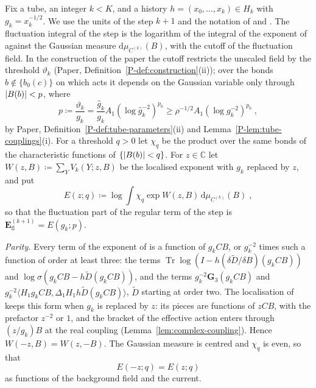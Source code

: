 \documentclass[11pt]{preprint}
\newcommand{\dd}{\mathrm{d}}
\DeclarePairedDelimiter{\abs}{\lvert}{\rvert}
\numberwithin{equation}{section}
\theoremstyle{definition}
\theoremstyle{remark}
\theoremstyle{plain}
\begin{document}
Fix a tube, an integer $k < K$, and a history $h = (x_0, \dots, x_k) \in H_k$ with $g_k = x_k^{-1/2}$. We use the units of the step $k + 1$ and the notation of \cite[Sect.~2]{BalabanRG1} and \cite{BalabanRG2}. The fluctuation integral of the step is the logarithm of the integral \cite[(2.12), (2.13), p.~268]{BalabanRG1} of the exponent of \cite[(2.12)]{BalabanRG1} against the Gaussian measure $\dd\mu_{C^{(k)}}(B)$, with the cutoff of the fluctuation field. In the construction of the paper the cutoff restricts the unscaled field by the threshold $\vartheta_k$ (Paper, Definition~\ref{P-def:construction}(ii)); over the bonds $b \notin \{ b_0(c) \}$ on which \cite[(2.9), p.~266]{BalabanRG1} acts it depends on the Gaussian variable only through $\abs{B(b)} < p$, where
\begin{equation}\label{eq:scaled-threshold}
    p \coloneqq \frac{\vartheta_k}{g_k} = \frac{\hat g_k}{g_k}A_1(\log\hat g_k^{-2})^{p_0} \geq \rho^{-1/2}A_1(\log g_k^{-2})^{p_0}\;,
\end{equation}
by Paper, Definition~\ref{P-def:tube-parameters}(ii) and Lemma~\ref{P-lem:tube-couplings}(i). For a threshold $q > 0$ let $\chi_q$ be the product over the same bonds of the characteristic functions of $\{ \abs{B(b)} < q \}$. For $z \in \mathbb C$ let $W(z, B) \coloneqq \sum_YV_k(Y; z, B)$ be the localised exponent \cite[(1.41), p.~11]{BalabanRG2} with $g_k$ replaced by $z$, and put
\begin{equation}\label{eq:complex-fluctuation-integral}
    E(z; q) \coloneqq \log\int\chi_q\exp W(z, B)\,\dd\mu_{C^{(k)}}(B)\;,
\end{equation}
so that the fluctuation part of the regular term of the step is $\mathbf E^{(k+1)}_{\mathrm{fl}} = E(g_k; p)$.

\emph{Parity.} Every term of the exponent of \cite[(2.12), p.~268]{BalabanRG1} is a function of $g_kCB$, or $g_k^{-2}$ times such a function of order at least three: the terms $\operatorname{Tr}\log(I - h(\delta\tilde D/\delta B)(g_kCB))$ and $\log\sigma(g_kCB - h\tilde D(g_kCB))$, and the terms $g_k^{-2}\mathbf G_3(g_kCB)$ and $g_k^{-2}\langle H_1g_kCB, \Delta_1H_1h\tilde D(g_kCB)\rangle$, $\tilde D$ starting at order two. The localisation of \cite[(1.33)--(1.41), pp.~9--11]{BalabanRG2} keeps this form when $g_k$ is replaced by $z$: its pieces are functions of $zCB$, with the prefactor $z^{-2}$ or $1$, and the bracket of the effective action enters through $(z/g_k)B$ at the real coupling (Lemma~\ref{lem:complex-coupling}). Hence $W(-z, B) = W(z, -B)$. The Gaussian measure is centred and $\chi_q$ is even, so that
\begin{equation}\label{eq:parity}
    E(-z; q) = E(z; q)
\end{equation}
as functions of the background field and the current.
\end{document}
